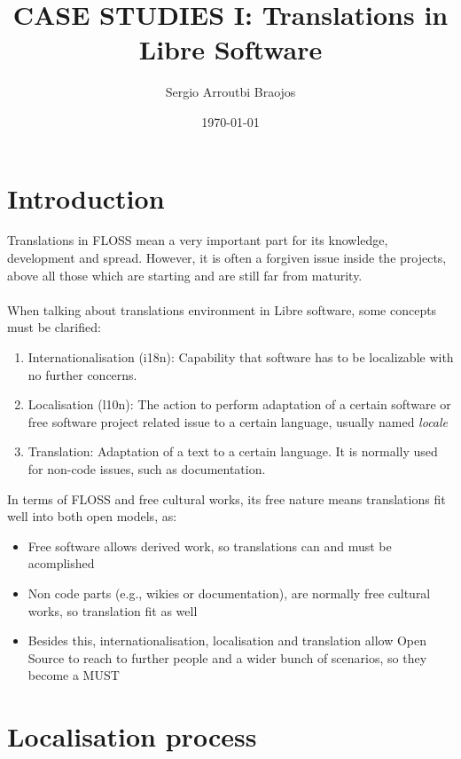\documentclass[11pt]{article}
\title{\textbf{CASE STUDIES I: Translations in Libre Software}}
\author{Sergio Arroutbi Braojos}
\date{\today}
\begin{document}
\maketitle

\section{Introduction}
Translations in FLOSS mean a very important part for its knowledge, development and spread. However, it is often a forgiven issue inside the projects, above all those which are starting and are still far from maturity.\\
\\
When talking about translations environment in Libre software, some concepts must be clarified:
\begin{enumerate}
\item Internationalisation (i18n): Capability that software has to be localizable with no further concerns.
\item Localisation (l10n): The action to perform adaptation of a certain software or free software project related issue to a certain language, usually named \emph{locale}
\item Translation: Adaptation of a text to a certain language. It is normally used for non-code issues, such as documentation.
\end{enumerate}
In terms of FLOSS and free cultural works, its free nature means translations fit well into both open models, as:
\begin{itemize}
\item Free software allows derived work, so translations can and must be acomplished
\item Non code parts (e.g., wikies or documentation), are normally free cultural works, so translation fit as well
\item Besides this, internationalisation, localisation and translation allow Open Source to reach to further people and a wider bunch of scenarios, so they become a MUST
\end{itemize}
\section{Localisation process}
\end{document}
